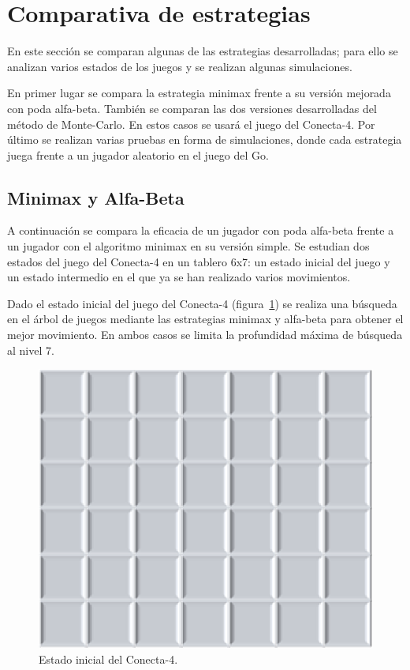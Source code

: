 
\section{Comparativa de estrategias}  
\label{sec:comparativa_estrategias}
En este sección se comparan algunas de las estrategias desarrolladas; para ello se analizan varios estados de los juegos y se realizan algunas simulaciones.

En primer lugar se compara la estrategia minimax frente a su versión mejorada con poda alfa-beta.
También se comparan las dos versiones desarrolladas del método de Monte-Carlo.
En estos casos se usará el juego del Conecta-4.
Por último se realizan varias pruebas en forma de simulaciones, donde cada estrategia juega frente a un jugador aleatorio en el juego del Go.

\subsection{Minimax y Alfa-Beta}
\label{ssec:comparativa_minimaxVSalfabeta}
A continuación se compara la eficacia de un jugador con poda alfa-beta frente a un jugador con el algoritmo minimax en su versión simple.
Se estudian dos estados del juego del Conecta-4 en un tablero 6x7: un estado inicial del juego y un estado intermedio en el que ya se han realizado varios movimientos.

\bigskip
Dado el estado inicial del juego del Conecta-4 (figura~\ref{fig:comparativa_minimax_alfabeta1}) se realiza una búsqueda en el árbol de juegos mediante las estrategias minimax y alfa-beta para obtener el mejor movimiento.
En ambos casos se limita la profundidad máxima de búsqueda al nivel 7.

\begin{figure}[b]
	\centering
	\includegraphics[scale=0.4]{contenido/cap7/imagenes/ckEstadoInicial.eps}
	\caption{Estado inicial del Conecta-4.}
	\label{fig:comparativa_minimax_alfabeta1}
\end{figure} 

